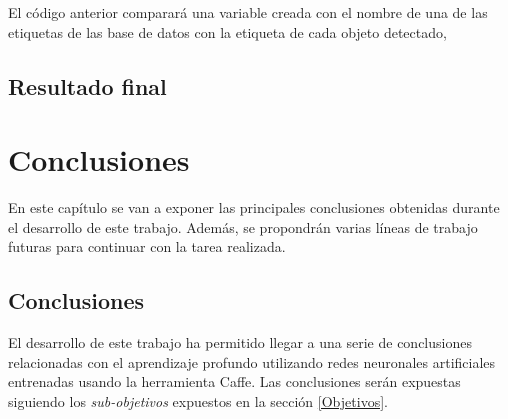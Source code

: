 \documentclass[a4paper, 12pt, spanish, chapterprefix, numbers=noenddot]{book}
\begin{document}
El código anterior comparará una variable creada con el nombre de una de las etiquetas de las base de datos con la etiqueta de cada objeto detectado, 

\section{Resultado final}


\chapter{Conclusiones}

En este capítulo se van a exponer las principales conclusiones obtenidas durante el desarrollo de este trabajo. Además, se propondrán varias líneas de trabajo futuras para continuar con la tarea realizada.

\section{Conclusiones}

El desarrollo de este trabajo ha permitido llegar a una serie de conclusiones relacionadas con el aprendizaje profundo utilizando redes neuronales artificiales entrenadas usando la herramienta Caffe. Las conclusiones serán expuestas siguiendo los \textit{sub-objetivos} expuestos en la sección \ref{Objetivos}.
\end{document}
